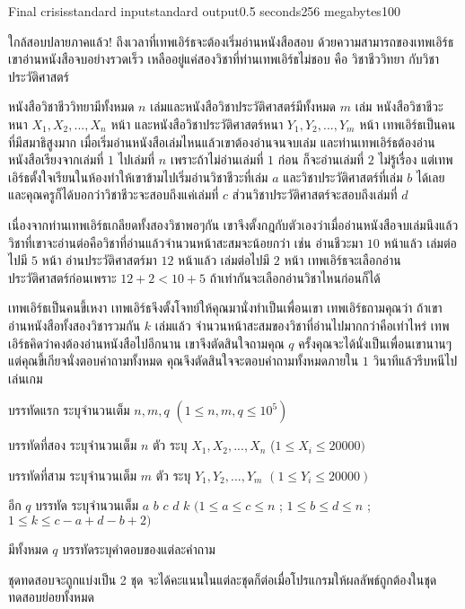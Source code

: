 \documentclass[11pt,a4paper]{article}
\begin{document}
\begin{problem}{Final crisis}{standard input}{standard output}{0.5 seconds}{256 megabytes}{100}

ใกล้สอบปลายภาคแล้ว! ถึงเวลาที่เทพเอิร์ธจะต้องเริ่มอ่านหนังสือสอบ ด้วยความสามารถของเทพเอิร์ธ เขาอ่านหนังสือจบอย่างรวดเร็ว เหลืออยู่แค่สองวิชาที่ท่านเทพเอิร์ธไม่ชอบ คือ วิชาชีววิทยา กับวิชาประวัติศาสตร์

 หนังสือวิชาชีววิทยามีทั้งหมด $n$ เล่มและหนังสือวิชาประวัติศาสตร์มีทั้งหมด $m$ เล่ม หนังสือวิชาชีวะหนา $X_1, X_2, ..., X_n $ หน้า และหนังสือวิชาประวัติศาสตร์หนา $Y_1, Y_2, ..., Y_m$ หน้า เทพเอิร์ธเป็นคนที่มีสมาธิสูงมาก เมื่อเริ่มอ่านหนังสือเล่มไหนแล้วเขาต้องอ่านจนจบเล่ม และท่านเทพเอิร์ธต้องอ่านหนังสือเรียงจากเล่มที่ $1$ ไปเล่มที่ $n$ เพราะถ้าไม่อ่านเล่มที่ $1$ ก่อน ก็จะอ่านเล่มที่ $2$ ไม่รู้เรื่อง แต่เทพเอิร์ธตั้งใจเรียนในห้องทำให้เขาข้ามไปเริ่มอ่านวิชาชีวะที่เล่ม $a$ และวิชาประวัติศาสตร์ที่เล่ม $b$ ได้เลย และคุณครูก็ได้บอกว่าวิชาชีวะจะสอบถึงแค่เล่มที่ $c$ ส่วนวิชาประวัติศาสตร์จะสอบถึงเล่มที่ $d$

เนื่องจากท่านเทพเอิร์ธเกลียดทั้งสองวิชาพอๆกัน เขาจึงตั้งกฎกับตัวเองว่าเมื่ออ่านหนังสือจบเล่มนึงแล้ววิชาที่เขาจะอ่านต่อคือวิชาที่อ่านแล้วจำนวนหน้าสะสมจะน้อยกว่า เช่น อ่านชีวะมา $10$ หน้าแล้ว เล่มต่อไปมี $5$ หน้า อ่านประวัติศาสตร์มา $12$ หน้าแล้ว เล่มต่อไปมี $2$ หน้า เทพเอิร์ธจะเลือกอ่านประวัติศาสตร์ก่อนเพราะ $12+2 < 10+5$ ถ้าเท่ากันจะเลือกอ่านวิชาไหนก่อนก็ได้

เทพเอิร์ธเป็นคนขี้เหงา เทพเอิร์ธจึงตั้งโจทย์ให้คุณมานั่งทำเป็นเพื่อนเขา เทพเอิร์ธถามคุณว่า ถ้าเขาอ่านหนังสือทั้งสองวิชารวมกัน $k$ เล่มแล้ว จำนวนหน้าสะสมของวิชาที่อ่านไปมากกว่าคือเท่าไหร่ เทพเอิร์ธคิดว่าคงต้องอ่านหนังสือไปอีกนาน เขาจึงตัดสินใจถามคุณ $q$ ครั้งคุณจะได้นั่งเป็นเพื่อนเขานานๆ แต่คุณขี้เกียจนั่งตอบคำถามทั้งหมด คุณจึงตัดสินใจจะตอบคำถามทั้งหมดภายใน $1$ วินาทีแล้วรีบหนีไปเล่นเกม


\InputFile
บรรทัดแรก ระบุจำนวนเต็ม $ n,m,q$ $( 1\leq n,m,q\leq10^5)$

บรรทัดที่สอง ระบุจำนวนเต็ม $n$ ตัว ระบุ $X_1, X_2, ..., X_n$ ($1\leq X_i\leq20000
)$

บรรทัดที่สาม ระบุจำนวนเต็ม $m$ ตัว ระบุ $Y_1,Y_2,...,Y_m$ $(1\leq Y_i\leq 20000)$

อีก $q$ บรรทัด ระบุจำนวนเต็ม $a$ $b$ $c$ $d$ $k$ $(1\leq a\leq c\leq n $ ; $1\leq b\leq d\leq n $ ; $ 1\leq k\leq c-a+d-b+2)$


\OutputFile
มีทั้งหมด $q$ บรรทัดระบุคำตอบของแต่ละคำถาม

\Scoring
ชุดทดสอบจะถูกแบ่งเป็น 2 ชุด จะได้คะแนนในแต่ละชุดก็ต่อเมื่อโปรแกรมให้ผลลัพธ์ถูกต้องในชุดทดสอบย่อยทั้งหมด


\end{problem}
\end{document}
